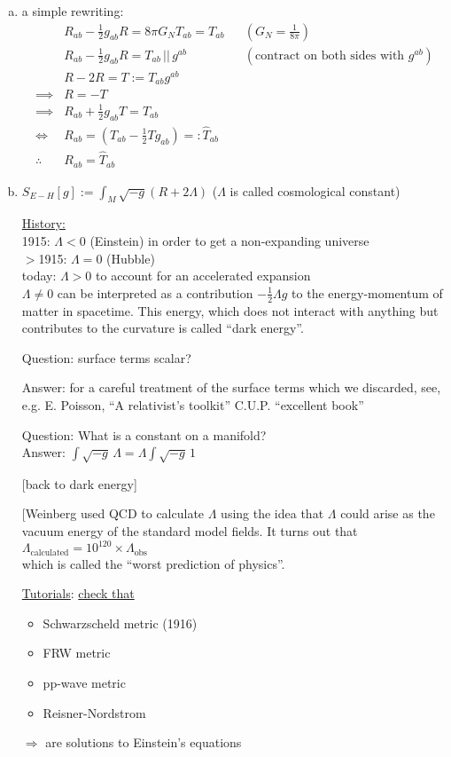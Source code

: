 \begin{enumerate}[(a)]
\item a simple rewriting:
\begin{align*}
& R_{ab} - \frac{1}{2} g_{ab} R = 8 \pi G_N T_{ab} = T_{ab} && (G_N = \frac{1}{8\pi}) \\
& R_{ab} - \frac{1}{2} g_{ab} R = T_{ab} \, || \, g^{ab} && (\text{contract on both sides with } g^{ab}) \\
& R - 2R = T := T_{ab}g^{ab} \\
\implies & R = -T \\
\implies & R_{ab} + \frac{1}{2} g_{ab} T = T_{ab} \\
\Longleftrightarrow & R_{ab} = (T_{ab} - \frac{1}{2} Tg_{ab}) =: \widehat{T}_{ab} \\
\therefore \quad & \boxed{ R_{ab} = \widehat{T}_{ab}}
\end{align*}

\item $S_{E-H}[g] := \int_M \sqrt{-g} (R+ 2\Lambda)$ \quad \quad ($\Lambda$ is called cosmological constant)

\underline{History:} \\
1915: $\Lambda < 0$ (Einstein) in order to get a non-expanding universe \\
$>$1915: $\Lambda = 0$ (Hubble) \\
today: $\Lambda > 0$ to account for an accelerated expansion \\
$\Lambda \neq 0$ can be interpreted as a contribution $-\frac{1}{2} \Lambda g$ to the energy-momentum of matter in spacetime. This energy, which does not interact with anything but contributes to the curvature is called ``dark energy''.

Question: surface terms scalar?

Answer: for a careful treatment of the surface terms which we discarded, see, e.g. E. Poisson, ``A relativist's toolkit'' C.U.P. ``excellent book''

Question: What is a constant on a manifold? \\
Answer: $\int \sqrt{-g} \, \Lambda = \Lambda \int \sqrt{-g} \, 1$

[back to dark energy]

[Weinberg used QCD to calculate $\Lambda$ using the idea that $\Lambda$ could arise as the vacuum energy of the standard model fields. It turns out that \\
$\Lambda_{\text{calculated}} = 10^{120} \times \Lambda_{\text{obs}}$ \\
which is called the ``worst prediction of physics''.


\underline{Tutorials}: \underline{check that }
\begin{itemize}
\item Schwarzscheld metric (1916)
\item FRW metric 
\item pp-wave metric 
\item Reisner-Nordstrom 
\end{itemize}
$\Longrightarrow $ are solutions to Einstein's equations
\end{enumerate}

